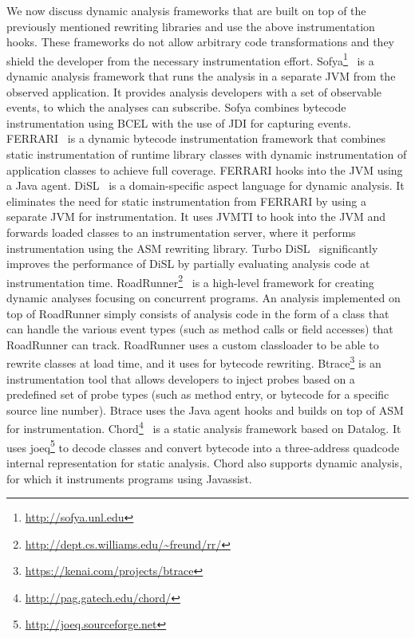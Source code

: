 We now discuss dynamic analysis frameworks that are built on top of the previously mentioned rewriting libraries
and use the above instrumentation hooks.
These frameworks do not allow arbitrary code transformations 
and they shield the developer from the necessary instrumentation effort.
%
Sofya\footnote{\url{http://sofya.unl.edu}}~\citep{kinneerSofyaSupportingRapid2007} 
is a dynamic analysis framework that runs the analysis in a separate JVM from the observed application.
It provides analysis developers with a set of observable events, to which the analyses can subscribe.
Sofya combines bytecode instrumentation using BCEL with the use of JDI for capturing events.
FERRARI~\citep{binderReengineeringStandardJava2007} is a dynamic bytecode instrumentation framework
that combines static instrumentation of runtime library classes with
dynamic instrumentation of application classes to achieve full coverage.
FERRARI hooks into the JVM using a Java agent.
DiSL~\citep{marekDiSLDomainspecificLanguage2012,marekDiSLExtensibleLanguage2012}
is a domain-specific aspect language for dynamic analysis.
It eliminates the need for static instrumentation from FERRARI
by using a separate JVM for instrumentation.
It uses JVMTI to hook into the JVM and 
forwards loaded classes to an instrumentation server,
where it performs instrumentation using the ASM rewriting library.
Turbo DiSL~\citep{zhengTurboDiSLPartial2012} significantly improves the performance of DiSL 
by partially evaluating analysis code at instrumentation time.
RoadRunner\footnote{\url{http://dept.cs.williams.edu/~freund/rr/}}~\citep{flanaganRoadRunnerDynamicAnalysis2010}
is a high-level framework for creating dynamic analyses focusing on concurrent programs.
An analysis implemented on top of RoadRunner simply consists of analysis code
in the form of a class that can handle the various event types 
(such as method calls or field accesses) that RoadRunner can track.
RoadRunner uses a custom classloader to be able to rewrite classes at load time,
and it uses \asm{} for bytecode rewriting.
Btrace\footnote{\url{https://kenai.com/projects/btrace}} is an instrumentation tool
that allows developers to inject probes based on a predefined set of probe types
(such as method entry, or bytecode for a specific source line number).
Btrace uses the Java agent hooks and builds on top of ASM for instrumentation.
Chord\footnote{\url{http://pag.gatech.edu/chord/}}~\citep{naik11} is a static analysis framework based on Datalog.
It uses joeq\footnote{\url{http://joeq.sourceforge.net}} to decode classes and 
convert bytecode into a three-address quadcode internal representation for static analysis.
Chord also supports dynamic analysis, 
for which it instruments programs using Javassist.

